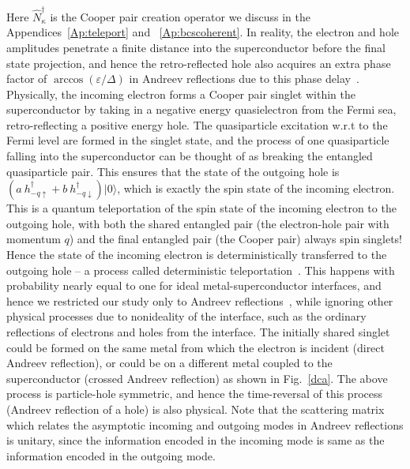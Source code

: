 \documentclass[10pt,letterpaper,aps,onecolumn,superscriptaddress,floatfix,notitlepage]{revtex4-1}
\begin{document}
	Here $\hat{N}_{\kappa}^{\dagger}$ is the Cooper pair creation operator we discuss in the Appendices~\ref{Ap:teleport} and ~\ref{Ap:bcscoherent}. In reality,	the electron and hole amplitudes penetrate  a finite distance into the superconductor before the final state projection, and hence the retro-reflected hole also acquires an extra phase factor of $\arccos({\varepsilon/\Delta})$ in Andreev reflections due to this phase delay~\cite{spintron}.	Physically, the incoming electron forms a Cooper pair singlet within the superconductor by taking in a negative energy quasielectron from the Fermi sea, retro-reflecting a positive energy hole. The quasiparticle excitation w.r.t to the Fermi level are formed in the singlet state, and the process of one quasiparticle falling into the superconductor can be thought of as breaking the entangled quasiparticle pair. This ensures that the state of the outgoing hole is  $(a~h^{\dagger}_{-q\uparrow}+b~h^{\dagger}_{-q\downarrow})|0\rangle$, which is exactly the spin state of the incoming electron. This is a quantum teleportation of the spin state of the incoming electron to the outgoing hole, with both the shared entangled pair (the electron-hole pair with momentum $q$) and the final entangled pair (the Cooper pair) always spin singlets! Hence the state of the incoming electron is deterministically transferred to the outgoing hole -- a process called deterministic teleportation~\cite{CTC,projection}. This happens with probability nearly equal to one for ideal metal-superconductor interfaces, and hence we restricted our study only to Andreev reflections~\cite{andreev,Pannet,spintron,artemenko1978excess,artemenko1979theory,artemenko1979excess,zaitsev1980theory}, while ignoring other physical processes due to nonideality of the interface, such as the ordinary reflections of electrons and holes from the interface. The initially shared singlet could be formed on the same metal from which the electron is incident (direct Andreev reflection), or could be on a different metal coupled to the superconductor (crossed Andreev reflection) as shown in Fig.~\ref{dca}.  The above process is particle-hole symmetric, and hence the time-reversal of this process (Andreev reflection of a hole) is also physical. Note that the scattering matrix which relates the asymptotic incoming and outgoing modes in Andreev reflections is unitary, since the information encoded in the incoming mode is same as the information encoded in the outgoing mode.
\end{document}

